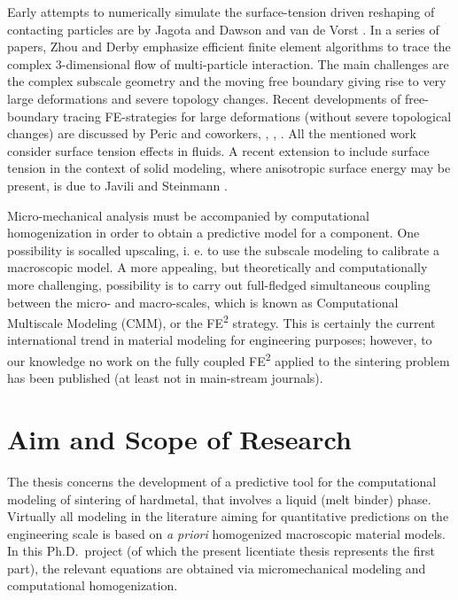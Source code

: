 \documentclass[ExampleMasters.tex]{subfiles}
\begin{document}
Early attempts to numerically simulate the surface-tension driven reshaping of contacting particles are by Jagota and Dawson \cite{JagDaw1988a,JagDaw1988b} and van de Vorst \cite{Vorst1993}.
In a series of papers, Zhou and Derby \cite{ZhoDer1998,ZhoDer2001} emphasize efficient finite element algorithms to trace the complex 3-dimensional flow of multi-particle interaction.
The main challenges  are the complex subscale geometry and the moving free boundary giving rise to very large deformations and severe topology changes.
Recent developments of free-boundary tracing FE-strategies for large deformations (without severe topological changes) are discussed by Peric and coworkers, \cite{DetPer2006}, \cite{SakPer2006a}, \cite{SakPer2006b}.
All the mentioned work consider surface tension effects in fluids.
A recent extension to include surface tension in the context of solid modeling, where anisotropic surface energy may be present, is due to Javili and Steinmann \cite{JavSte2010:3d}.

Micro-mechanical analysis must be accompanied by computational homogenization in order to obtain a predictive model for a component.
One possibility is socalled upscaling, i. e. to use the subscale modeling to calibrate a macroscopic model.
A more appealing, but theoretically and computationally more challenging, possibility is to carry out full-fledged simultaneous coupling between the micro- and macro-scales, which is known as Computational Multiscale Modeling (CMM), or the FE\textsuperscript{2} strategy.
This is certainly the current international trend in material modeling for engineering purposes; however, to our knowledge no work on the fully coupled FE\textsuperscript{2} applied to the sintering problem has been published (at least not in main-stream journals).

\chapter{Aim and Scope of Research}

The thesis concerns the development of a predictive tool for the computational modeling of sintering of hardmetal, that involves a liquid (melt binder) phase.
Virtually all modeling in the literature aiming for quantitative predictions on the engineering scale is based on \emph{a priori} homogenized macroscopic material models.
In this Ph.D.\ project (of which the present licentiate thesis represents the first part), the relevant equations are obtained via micromechanical modeling and computational homogenization.
\end{document}
